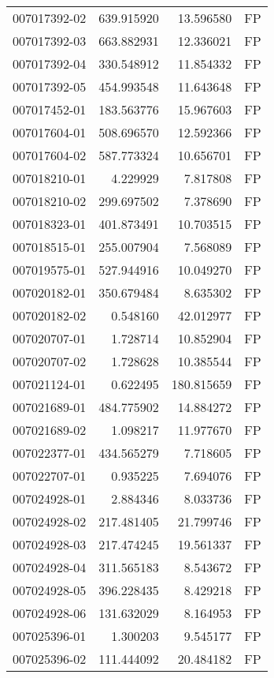 \begin{tabular}{lrrl}
007017392-02 &  639.915920 &    13.596580 &   FP \\
007017392-03 &  663.882931 &    12.336021 &   FP \\
007017392-04 &  330.548912 &    11.854332 &   FP \\
007017392-05 &  454.993548 &    11.643648 &   FP \\
007017452-01 &  183.563776 &    15.967603 &   FP \\
007017604-01 &  508.696570 &    12.592366 &   FP \\
007017604-02 &  587.773324 &    10.656701 &   FP \\
007018210-01 &    4.229929 &     7.817808 &   FP \\
007018210-02 &  299.697502 &     7.378690 &   FP \\
007018323-01 &  401.873491 &    10.703515 &   FP \\
007018515-01 &  255.007904 &     7.568089 &   FP \\
007019575-01 &  527.944916 &    10.049270 &   FP \\
007020182-01 &  350.679484 &     8.635302 &   FP \\
007020182-02 &    0.548160 &    42.012977 &   FP \\
007020707-01 &    1.728714 &    10.852904 &   FP \\
007020707-02 &    1.728628 &    10.385544 &   FP \\
007021124-01 &    0.622495 &   180.815659 &   FP \\
007021689-01 &  484.775902 &    14.884272 &   FP \\
007021689-02 &    1.098217 &    11.977670 &   FP \\
007022377-01 &  434.565279 &     7.718605 &   FP \\
007022707-01 &    0.935225 &     7.694076 &   FP \\
007024928-01 &    2.884346 &     8.033736 &   FP \\
007024928-02 &  217.481405 &    21.799746 &   FP \\
007024928-03 &  217.474245 &    19.561337 &   FP \\
007024928-04 &  311.565183 &     8.543672 &   FP \\
007024928-05 &  396.228435 &     8.429218 &   FP \\
007024928-06 &  131.632029 &     8.164953 &   FP \\
007025396-01 &    1.300203 &     9.545177 &   FP \\
007025396-02 &  111.444092 &    20.484182 &   FP \\

\end{tabular}
